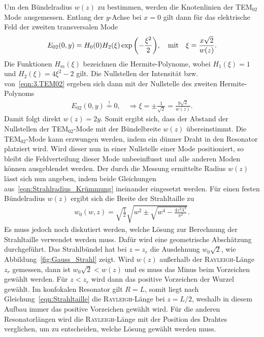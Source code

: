 \documentclass[a4paper,twoside,final]{article}
\begin{document}
Um den Bündelradius $w(z)$ zu bestimmen, werden die Knotenlinien der TEM$_{02}$ Mode ausgemessen. Entlang der $y$-Achse bei $x=0$ gilt dann für das elektrische Feld der zweiten transversalen Mode~\cite{Eichler}
\begin{align}\label{eqn:3.TEM02}
  E_{02}(0,y) = H_0(0) H_2(\xi) \exp\qty(-\frac{\xi^2}{2}), \quad \text{mit} \quad \xi = \frac{x\sqrt{2}}{w(z)}.
\end{align}
Die Funktionen $H_m(\xi)$ bezeichnen die Hermite-Polynome, wobei $H_1(\xi) = 1$ und $H_2(\xi) = 4\xi^2- 2$ gilt. Die Nullstellen der Intensität bzw. von~\eqref{eqn:3.TEM02} ergeben sich dann mit der Nullstelle des zweiten Hermite-Polynoms
\begin{align}
  E_{02}(0,y) \overset{!}{=} 0, \quad \Rightarrow \xi = \pm \frac{1}{\sqrt{2}} = \frac{y \sqrt{2}}{w(z)}.
\end{align}
Damit folgt direkt $w(z) = 2y$. Somit ergibt sich, dass der Abstand der Nullstellen der TEM$_{02}$-Mode mit der Bündelbreite $w(z)$ übereinstimmt. Die TEM$_{02}$-Mode kann erzwungen werden, indem ein dünner Draht in den Resonator platziert wird. Wird dieser nun in einer Nullstelle einer Mode positioniert, so bleibt die Feldverteilung dieser Mode unbeeinflusst und alle anderen Moden können ausgeblendet werden. Der durch die Messung ermittelte Radius $w(z)$ lässt sich nun angeben, indem beide Gleichungen aus~\eqref{eqn:Strahlradius_Krümmung} ineinander eingesetzt werden. Für einen festen Bündelradius $w(z)$ ergibt sich die Breite der Strahltaille zu~\cite{Anleitung}
\begin{align}\label{eqn:Strahltaille_Experimentell}
  w_0(w,z) = \sqrt{\frac{1}{2}} \sqrt{w^2 \pm \sqrt{w^4-\frac{4z^2 \lambda^2}{\pi^2}}}.
\end{align}
Es muss jedoch noch diskutiert werden, welche Lösung zur Berechnung der Strahltaille verwendet werden muss. Dafür wird eine geometrische Abschätzung durchgeführt. Das Strahlbündel hat bei $z = z_r$ die Ausdehnung $w_0 \sqrt{2}$, wie Abbildung~\ref{fig:Gauss_Strahl} zeigt. Wird $w(z)$ außerhalb der \textsc{Rayleigh}-Länge $z_r$ gemessen, dann ist $w_0 \sqrt{2} < w(z)$ und es muss das Minus beim Vorzeichen gewählt werden. Für $z < z_r$ wird dann das positive Vorzeichen der Wurzel gewählt. Im konfokalen Resonator gilt $R=L$, somit liegt nach Gleichung~\eqref{eqn:Strahltaille} die \textsc{Rayleigh}-Länge bei $z = L/2$, weshalb in diesem Aufbau immer das positive Vorzeichen gewählt wird. Für die anderen Resonatorlängen wird die \textsc{Rayleigh}-Länge mit der Position des Drahtes verglichen, um zu entscheiden, welche Lösung gewählt werden muss.
\end{document}
